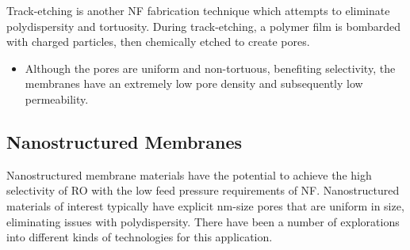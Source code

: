   Track-etching is another NF fabrication technique which attempts to eliminate 
  polydispersity and tortuosity. During track-etching, a polymer film is bombarded with 
  charged particles, then chemically etched to create pores.~\cite{apel_track_2001}
  \begin{itemize}
	\item Although the pores are uniform and non-tortuous, benefiting selectivity, the 
	membranes have an extremely low pore density and subsequently low permeability. 
  \end{itemize}
  
  \subsection{Nanostructured Membranes}
  
  Nanostructured membrane materials have the potential to achieve the high selectivity
  of RO with the low feed pressure requirements of NF. Nanostructured materials of 
  interest typically have explicit nm-size pores that are uniform in size, eliminating
  issues with polydispersity. There have been a number of explorations into different
  kinds of technologies for this application.
  

